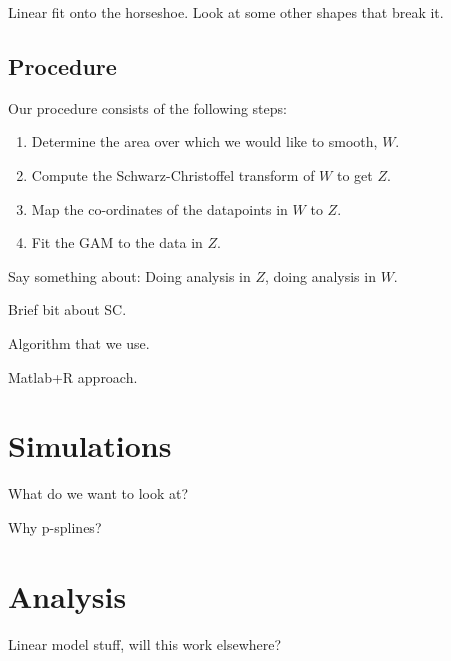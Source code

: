 \documentclass[a4paper,10pt]{amsart}
\newcommand{\sch}{Schwarz-Christoffel }
\begin{document}
Linear fit onto the horseshoe.
Look at some other shapes that break it.



\subsection{Procedure}

Our procedure consists of the following steps:

\begin{enumerate}
\item Determine the area over which we would like to smooth, $W$.

\item Compute the \sch transform of $W$ to get $Z$.

\item Map the co-ordinates of the datapoints in $W$ to $Z$.

\item Fit the GAM to the data in $Z$.

\end{enumerate}

Say something about:
Doing analysis in $Z$, doing analysis in $W$.




Brief bit about SC.

Algorithm that we use.

Matlab+R approach.



\section{Simulations}

What do we want to look at?

Why p-splines?


\section{Analysis}


Linear model stuff, will this work elsewhere?
















\end{document}
